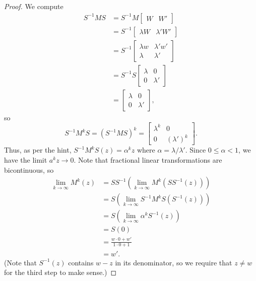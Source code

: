 \documentclass[12pt]{article}
\newcommand{\<}{\langle}
\renewcommand{\>}{\rangle}
\newcommand{\mat}[1]{\begin{bmatrix}#1\end{bmatrix}}
\begin{document}
\begin{proof}
    We compute
    \begin{align*}
        S^{-1}MS
            &= S^{-1}M\mat{W & W'} \\
            &= S^{-1}\mat{\lambda W & \lambda' W'} \\
            &= S^{-1}\mat{\lambda w & \lambda' w' \\ \lambda & \lambda'} \\
            &= S^{-1}S\mat{\lambda & 0 \\ 0 & \lambda'} \\
            &= \mat{\lambda & 0 \\ 0 & \lambda'},
    \end{align*}
    so
    \[
        S^{-1}M^kS = (S^{-1}MS)^k = \mat{\lambda^k & 0 \\ 0 & (\lambda')^k}.
    \]
    Thus, as per the hint, $S^{-1}M^kS(z) = \alpha^kz$ where $\alpha = \lambda/\lambda'$. Since $0 \leq \alpha < 1$, we have the limit $a^kz \to 0$. Note that fractional linear transformations are bicontinuous, so
    \begin{align*}
        \lim_{k \to \infty} M^k(z)
            &= SS^{-1}\left(\lim_{k \to \infty} M^k(SS^{-1}(z))\right) \\
            &= S\left(\lim_{k \to \infty} S^{-1}M^kS(S^{-1}(z))\right) \\
            &= S\left(\lim_{k \to \infty} \alpha^kS^{-1}(z)\right) \\
            &= S(0) \\
            &= \frac{w \cdot 0 + w'}{1 \cdot 0 + 1} \\
            &= w'.
    \end{align*}
    (Note that $S^{-1}(z)$ contains $w - z$ in its denominator, so we require that $z \ne w$ for the third step to make sense.)

\end{proof}
\end{document}

